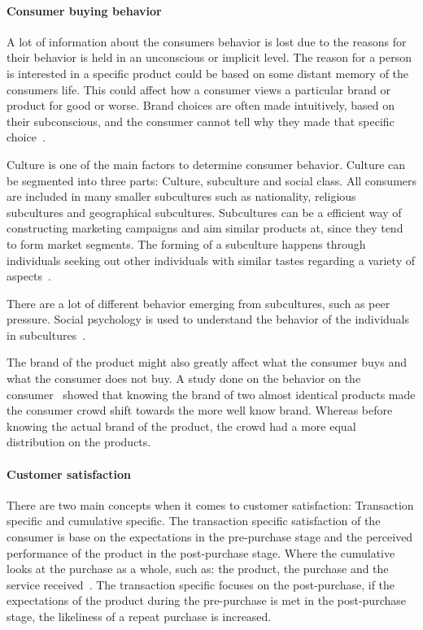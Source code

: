 \paragraph{Consumer buying behavior}

A lot of information about the consumers behavior is lost due to the reasons
for their behavior is held in an unconscious or implicit level.  The reason for
a person is interested in a specific product could be based on some distant
memory of the consumers life.  This could affect how a consumer views a
particular brand or product for good or worse.  Brand choices are often made
intuitively, based on their subconscious, and the consumer cannot tell why
they made that specific choice~\cite{vignali2009fashion}.

Culture is one of the main factors to determine consumer behavior.  Culture can
be segmented into three parts: Culture, subculture and social class.  All
consumers are included in many smaller subcultures such as nationality,
religious subcultures and geographical subcultures.  Subcultures can be a
efficient way of constructing marketing campaigns and aim similar products at,
since they tend to form market segments.  The forming of a subculture happens
through individuals seeking out other individuals with similar tastes regarding
a variety of aspects~\cite{vignali2009fashion}.

There are a lot of different behavior emerging from subcultures, such as peer
pressure.  Social psychology is used to understand the behavior of the
individuals in subcultures~\cite{vignali2009fashion}.

The brand of the product might also greatly affect what the consumer buys and
what the consumer does not buy.  A study done on the behavior on the
consumer~\cite{deLace2010} showed that knowing the brand of two almost
identical products made the consumer crowd shift towards the more well know
brand.  Whereas before knowing the actual brand of the product, the crowd had a
more equal distribution on the products.

\paragraph{Customer satisfaction}

There are two main concepts when it comes to customer satisfaction: Transaction
specific and cumulative specific.  The transaction specific satisfaction of the
consumer is base on the expectations in the pre-purchase stage and the
perceived performance of the product in the post-purchase stage.  Where the
cumulative looks at the purchase as a whole, such as: the product, the purchase
and the service received~\cite{kumari2012}.  The transaction specific focuses
on the post-purchase, if the expectations of the product during the
pre-purchase is met in the post-purchase stage, the likeliness of a repeat
purchase is increased.

